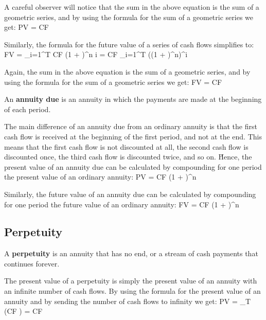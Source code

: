 A careful observer will notice that the sum in the above equation is the sum of a geometric series, and by using the
formula for the sum of a geometric series we get:
\bse
PV = CF \cdot {}
\ese

Similarly, the formula for the future value of a series of cash flows simplifies to:
\bse
FV = \sum_{i=1}^T CF \cdot (1 + )^{n \cdot i} = CF \cdot \sum_{i=1}^T \Big((1 + )^n\Big)^i
\ese

Again, the sum in the above equation is the sum of a geometric series, and by using the formula for the sum of a
geometric series we get:
\bse
FV = CF \cdot {}
\ese

An \textbf{annuity due} is an annuity in which the payments are made at the beginning of each period.
\ed


The main difference of an annuity due from an ordinary annuity is that the first cash flow is received at the beginning
of the first period, and not at the end. This means that the first cash flow is not discounted at all, the second cash
flow is discounted once, the third cash flow is discounted twice, and so on. \v

Hence, the present value of an annuity due can be calculated by compounding for one period the present value of an
ordinary annuity:
\bse
PV = CF \cdot {} \cdot (1 + )^{n}
\ese

Similarly, the future value of an annuity due can be calculated by compounding for one period the future value of an
ordinary annuity:
\bse
FV = CF \cdot {} \cdot (1 + )^{n}
\ese

\subsection{Perpetuity}

\bd[Perpetuity]
A \textbf{perpetuity} is an annuity that has no end, or a stream of cash payments that continues forever.
\ed

The present value of a perpetuity is simply the present value of an annuity with an infinite number of cash flows.
By using the formula for the present value of an annuity and by sending the number of cash flows to infinity we get:
\bse
PV = \lim_{T \to \infty} \Big(CF \cdot {}\Big) = CF \cdot
{}
\ese

